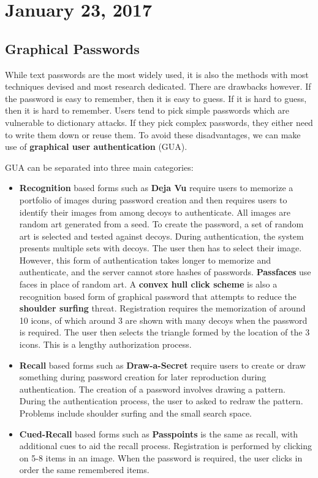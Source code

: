 \documentclass[11pt]{article}
\theoremstyle{plain} %
\theoremstyle{definition}
\theoremstyle{example}
\theoremstyle{remark}
\begin{document}
\section{January 23, 2017}
\subsection{Graphical Passwords}

While text passwords are the most widely used,  it is also the methods with most techniques devised and most research dedicated. There are drawbacks however. If the password is easy to remember, then it is easy to guess. If it is hard to guess, then it is hard to remember. Users tend to pick simple passwords which are vulnerable to dictionary attacks. If they pick complex passwords, they either need to write them down or reuse them. To avoid these disadvantages, we can make use of \textbf{graphical user authentication} (GUA). 

GUA can be separated into three main categories:
\begin{itemize}
	\item \textbf{Recognition} based forms such as \textbf{Deja Vu} require users to memorize a portfolio of images during password creation and then requires users to identify their images from among decoys to authenticate. All images are random art generated from a seed. To create the password, a set of random art is selected and tested against decoys. During authentication, the system presents multiple sets with decoys. The user then has to select their image. However, this form of authentication takes longer to memorize and authenticate, and the server cannot store hashes of passwords. \textbf{Passfaces} use faces in place of random art. A \textbf{convex hull click scheme} is also a recognition based form of graphical password that attempts to reduce the \textbf{shoulder surfing} threat. Registration requires the memorization of around 10 icons, of which around 3 are shown with many decoys when the password is required. The user then selects the triangle formed by the location of the 3 icons. This is a lengthy authorization process. 
	\item \textbf{Recall} based forms such as \textbf{Draw-a-Secret} require users to create or draw something during password creation for later reproduction during authentication. The creation of a password involves drawing a pattern. During the authentication process, the user to asked to redraw the pattern. Problems include shoulder surfing and the small search space. 
	\item \textbf{Cued-Recall} based forms such as \textbf{Passpoints} is the same as recall, with additional cues to aid the recall process. Registration is performed by clicking on 5-8 items in an image. When the password is required, the user clicks in order the same remembered items. 
\end{itemize}
\end{document}
